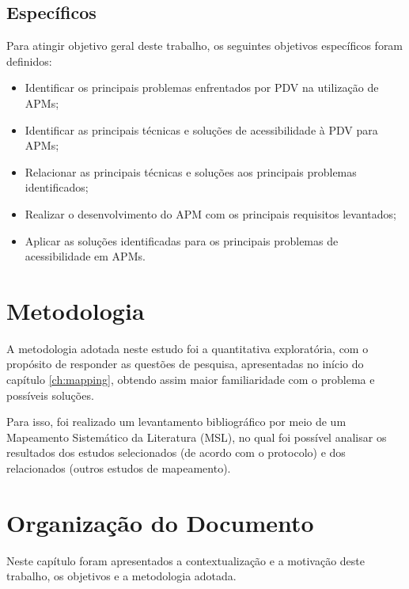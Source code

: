 \subsection{Específicos}

Para atingir objetivo geral deste trabalho, os seguintes objetivos específicos foram definidos:

\begin{itemize}
    \item Identificar os principais problemas enfrentados por PDV na utilização de APMs;
    \item Identificar as principais técnicas e soluções de acessibilidade à PDV para APMs;
    \item Relacionar as principais técnicas e soluções aos principais problemas identificados;
    \item Realizar o desenvolvimento do APM com os principais requisitos levantados;
    \item Aplicar as soluções identificadas para os principais problemas de acessibilidade em APMs\@.
\end{itemize}

\section{Metodologia}

A metodologia adotada neste estudo foi a quantitativa exploratória, com o propósito de responder as questões de pesquisa, apresentadas
no início do capítulo \ref{ch:mapping}, obtendo assim maior familiaridade com o problema e possíveis soluções.

Para isso, foi realizado um levantamento bibliográfico por meio de um Mapeamento Sistemático da Literatura (MSL), no qual foi possível
analisar os resultados dos estudos selecionados (de acordo com o protocolo) e dos relacionados (outros estudos de mapeamento).

\section{Organização do Documento}
Neste capítulo foram apresentados a contextualização e a motivação deste trabalho, os objetivos e a metodologia adotada.

